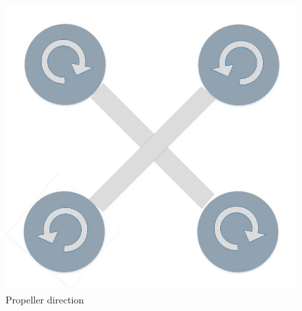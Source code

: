 \\\\
\begin{figure}[h]
          \centering
            \includegraphics[scale = 0.33]{VAPIQ-PICTURES/dir_x_copter.jpg}
                \caption{Propeller direction}
            \label{dir}
\end{figure}